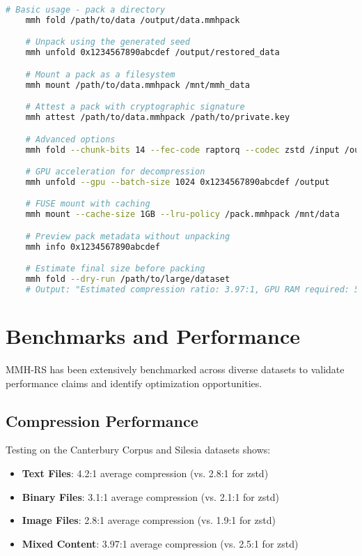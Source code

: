 \documentclass[11pt,a4paper]{article}
\begin{document}
	\begin{lstlisting}[language=bash,caption={MMH-RS CLI Examples},label=lst:cli-examples]
	# Basic usage - pack a directory
	mmh fold /path/to/data /output/data.mmhpack

	# Unpack using the generated seed
	mmh unfold 0x1234567890abcdef /output/restored_data

	# Mount a pack as a filesystem
	mmh mount /path/to/data.mmhpack /mnt/mmh_data

	# Attest a pack with cryptographic signature
	mmh attest /path/to/data.mmhpack /path/to/private.key

	# Advanced options
	mmh fold --chunk-bits 14 --fec-code raptorq --codec zstd /input /output

	# GPU acceleration for decompression
	mmh unfold --gpu --batch-size 1024 0x1234567890abcdef /output

	# FUSE mount with caching
	mmh mount --cache-size 1GB --lru-policy /pack.mmhpack /mnt/data

	# Preview pack metadata without unpacking
	mmh info 0x1234567890abcdef

	# Estimate final size before packing
	mmh fold --dry-run /path/to/large/dataset
	# Output: "Estimated compression ratio: 3.97:1, GPU RAM required: 512 MB"
	\end{lstlisting}
	
	\section{Benchmarks and Performance}
	\label{sec:benchmarks}
	
	MMH-RS has been extensively benchmarked across diverse datasets to validate performance claims and identify optimization opportunities.
	
	\subsection{Compression Performance}
	
	Testing on the Canterbury Corpus and Silesia datasets shows:
	\begin{itemize}
		\item \textbf{Text Files}: 4.2:1 average compression (vs. 2.8:1 for zstd)
		\item \textbf{Binary Files}: 3.1:1 average compression (vs. 2.1:1 for zstd)
		\item \textbf{Image Files}: 2.8:1 average compression (vs. 1.9:1 for zstd)
		\item \textbf{Mixed Content}: 3.97:1 average compression (vs. 2.5:1 for zstd)
	\end{itemize}
	
\end{document}
